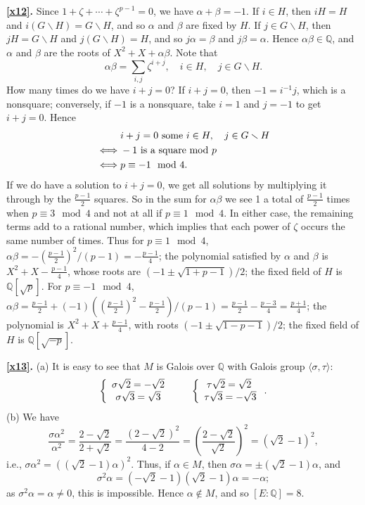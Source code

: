 \documentclass[a4paper,11pt,final,openany]{memoir}
\theoremstyle{nonumberplain}
\begin{document}
\medskip\noindent\textbf{\ref{x12}.} Since $1+\zeta+\cdots+\zeta^{p-1}=0$, we
have $\alpha+\beta=-1$. If $i\in H$, then $iH=H$ and $i(G\smallsetminus
H)=G\smallsetminus H$, and so $\alpha$ and $\beta$ are fixed by $H$. If $j\in
G\smallsetminus H$, then $jH=G\smallsetminus H$ and $j(G\smallsetminus H)=H$,
and so $j\alpha=\beta$ and $j\beta=\alpha$. Hence $\alpha\beta\in{\mathbb{Q}}%
$, and $\alpha$ and $\beta$ are the roots of $X^{2}+X+\alpha\beta$. Note that
\[
\alpha\beta=\sum_{i,j}\zeta^{i+j},\quad i\in H,\quad j\in G\smallsetminus H.
\]
How many times do we have $i+j=0$? If $i+j=0$, then $-1=i^{-1}j$, which is a
nonsquare; conversely, if $-1$ is a nonsquare, take $i=1$ and $j=-1$ to get
$i+j=0$. Hence
\begin{align*}
& i+j=0\text{\textrm{\ some }}i\in H,\quad j\in G\smallsetminus H\\
\iff &
-1\text{\textrm{\ is a square mod }}p\\
\iff &p\equiv-1\mod4.
\end{align*}
If we do have a solution to $i+j=0$, we get all solutions by multiplying it
through by the $\frac{p-1}{2}$ squares. So in the sum for $\alpha\beta$ we see
1 a total of $\frac{p-1}{2}$ times when $p\equiv3\mod4$ and not at all if
$p\equiv1\mod4$. In either case, the remaining terms add to a rational number,
which implies that each power of $\zeta$ occurs the same number of times. Thus
for $p\equiv1\mod4$, $\alpha\beta=-(\frac{p-1}{2})^{2}/(p-1)=-\frac{p-1}{4}$;
the polynomial satisfied by $\alpha$ and $\beta$ is $X^{2}+X-\frac{p-1}{4}$,
whose roots are $(-1\pm\sqrt{1+p-1})/2$; the fixed field of $H$ is
${\mathbb{Q}}[\sqrt{p}]$. For $p\equiv-1\mod4$, $\alpha\beta=\frac{p-1}%
{2}+(-1)\left(  (\frac{p-1}{2})^{2}-\frac{p-1}{2}\right)  /(p-1)=\frac{p-1}%
{2}-\frac{p-3}{4}=\frac{p+1}{4}$; the polynomial is $X^{2}+X+\frac{p-1}{4}$,
with roots $(-1\pm\sqrt{1-p-1})/2$; the fixed field of $H$ is ${\mathbb{Q}%
}[\sqrt{-p}]$.



\medskip\noindent\textbf{\ref{x13}.} (a) It is easy to see that $M$ is Galois
over ${\mathbb{Q}}$ with Galois group $\langle\sigma,\tau\rangle$:%
\[
\left\{
\begin{array}
[c]{c}%
\sigma\sqrt{2}=-\sqrt{2}\newline\\
\sigma\sqrt{3}=\sqrt{3}%
\end{array}
\right.  \quad\quad\left\{
\begin{array}
[c]{c}%
\tau\sqrt{2}=\sqrt{2}\newline\\
\tau\sqrt{3}=-\sqrt{3}%
\end{array}
\right.  .
\]
\noindent(b) We have
\[
\frac{\sigma\alpha^{2}}{\alpha^{2}}=\frac{2-\sqrt{2}}{2+\sqrt{2}}%
=\frac{(2-\sqrt{2})^{2}}{4-2}=\left(  \frac{2-\sqrt{2}}{\sqrt{2}}\right)
^{2}=(\sqrt{2}-1)^{2},
\]
i.e., $\sigma\alpha^{2}=((\sqrt{2}-1)\alpha)^{2}$. Thus, if $\alpha\in M$,
then $\sigma\alpha=\pm(\sqrt{2}-1)\alpha$, and
\[
\sigma^{2}\alpha=(-\sqrt{2}-1)(\sqrt{2}-1)\alpha=-\alpha;
\]
as $\sigma^{2}\alpha=\alpha\neq0$, this is impossible. Hence $\alpha\notin M$,
and so $[E\colon{\mathbb{Q}}]=8$.
\end{document}
